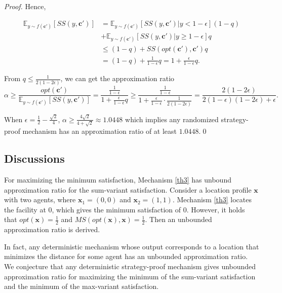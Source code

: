 \documentclass[runningheads]{11llncst}
\begin{document}
\begin{proof}
		Hence, 
        
		\begin{equation*}
			\begin{aligned}
				\mathbb{E}_{y\sim f(\textbf{c}')}[SS(y,\textbf{c}')]&=\mathbb{E}_{y\sim f(\textbf{c}')}[SS(y,\textbf{c}')|y<1-\epsilon](1-q)\\
                &+\mathbb{E}_{y\sim f(\textbf{c}')}[SS(y,\textbf{c}')| y\geq 1-\epsilon]q\\
				&\leq (1-q)+SS(opt(\textbf{c}'),\textbf{c}')q\\
				&=(1-q)+\frac{1}{1-\epsilon}q=1+\frac{\epsilon}{1-\epsilon}q.
			\end{aligned}
		\end{equation*}
        
		From $q\leq \frac{1}{2(1-2\epsilon)}$, we can get the approximation ratio
		\begin{equation*}
			\alpha \geq \frac{opt(\textbf{c}')}{\mathbb{E}_{y\sim f(\textbf{c}')}[SS(y,\textbf{c}')]}=\frac{\frac{1}{1-\epsilon}}{1+\frac{\epsilon}{1-\epsilon}q}\geq \frac{\frac{1}{1-\epsilon}}{1+\frac{\epsilon}{1-\epsilon}\cdot\frac{1}{2(1-2\epsilon)}}=\frac{2(1-2\epsilon)}{2(1-\epsilon)(1-2\epsilon)+\epsilon}.
		\end{equation*}
		
		When $\epsilon=\frac{1}{2}-\frac{\sqrt{2}}{4}$, $\alpha\geq \frac{4\sqrt{2}}{4+\sqrt{2}}\approx1.0448$ which implies any randomized strategy-proof  mechanism has an approximation ratio of at least $1.0448$.\qed
\end{proof}

\subsection{Discussions}

For maximizing the minimum  satisfaction, Mechanism \ref{th3} has unbound approximation ratio for the sum-variant satisfaction. Consider a location profile $\textbf{x}$ with two agents, where $\textbf{x}_1=(0,0)$ and $\textbf{x}_2=(1,1)$. Mechanism \ref{th3} locates the facility at 0, which gives the minimum satisfaction of 0. However, it holds that $opt(\textbf{x})=\frac{1}{2}$ and $MS(opt(\textbf{x}),\textbf{x})=\frac{1}{2}$. Then an unbounded approximation ratio is derived. 

In fact, any deterministic mechanism whose output corresponds to a location that minimizes the distance for some agent has an unbounded approximation ratio. We conjecture that any deterministic strategy-proof mechanism gives  unbounded approximation ratio for maximizing the minimum  of the sum-variant satisfaction and the minimum of  the max-variant satisfaction. 
\end{document}
